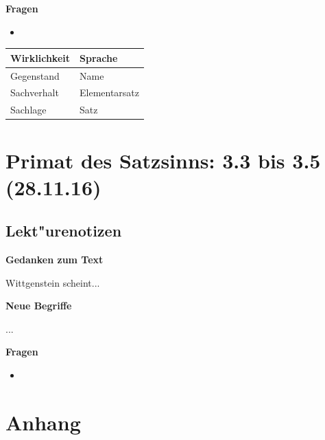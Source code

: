 \documentclass[]{scrartcl}
\begin{document}
\textbf{Fragen}

\begin{itemize}
  \item 
\end{itemize}

\begin{center}
    \begin{tabular}{  l | l }
    \textbf{Wirklichkeit} & \textbf{Sprache}\\ \hline
    Gegenstand & Name \\ 
    Sachverhalt & Elementarsatz \\
    Sachlage & Satz \\
    \end{tabular}
\end{center}


\section{Primat des Satzsinns: 3.3 bis 3.5\\(28.11.16)}


\subsection{Lekt"urenotizen}
\textbf{Gedanken zum Text}

Wittgenstein scheint...

\vspace{10pt}
\textbf{Neue Begriffe}

\begin{description}[leftmargin=!,labelwidth=\widthof{\bfseries Sachverhalt}]
  \item[Bild] ...
  \item[Tatsache] 
\end{description}

\textbf{Fragen}

\begin{itemize}
  \item 
\end{itemize}



\newpage
\section{Anhang}
\end{document}
